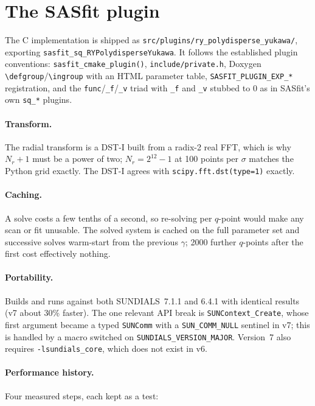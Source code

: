 \documentclass[11pt,a4paper]{article}
\newcommand{\code}[1]{\texttt{#1}}
\begin{document}
\section{The SASfit plugin}

The C implementation is shipped as
\code{src/plugins/ry\_polydisperse\_yukawa/}, exporting
\code{sasfit\_sq\_RYPolydisperseYukawa}. It follows the established plugin
conventions: \code{sasfit\_cmake\_plugin()}, \code{include/private.h}, Doxygen
\code{\textbackslash defgroup}/\code{\textbackslash ingroup} with an HTML
parameter table, \code{SASFIT\_PLUGIN\_EXP\_*} registration, and the
\code{func}/\code{\_f}/\code{\_v} triad with \code{\_f} and \code{\_v} stubbed
to $0$ as in SASfit's own \code{sq\_*} plugins.

\paragraph{Transform.} The radial transform is a DST-I built from a radix-2
real FFT, which is why $N_r+1$ must be a power of two; $N_r=2^{12}-1$ at 100
points per $\sigma$ matches the Python grid exactly. The DST-I agrees with
\code{scipy.fft.dst(type=1)} exactly.

\paragraph{Caching.} A solve costs a few tenths of a second, so re-solving per
$q$-point would make any scan or fit unusable. The solved system is cached on
the full parameter set and successive solves warm-start from the previous
$\gamma$; 2000 further $q$-points after the first cost effectively nothing.

\paragraph{Portability.} Builds and runs against both SUNDIALS~7.1.1 and
6.4.1 with identical results (v7 about 30\% faster). The one relevant API
break is \code{SUNContext\_Create}, whose first argument became a typed
\code{SUNComm} with a \code{SUN\_COMM\_NULL} sentinel in v7; this is handled
by a macro switched on \code{SUNDIALS\_VERSION\_MAJOR}. Version~7 also
requires \code{-lsundials\_core}, which does not exist in v6.

\paragraph{Performance history.} Four measured steps, each kept as a test:
\end{document}
